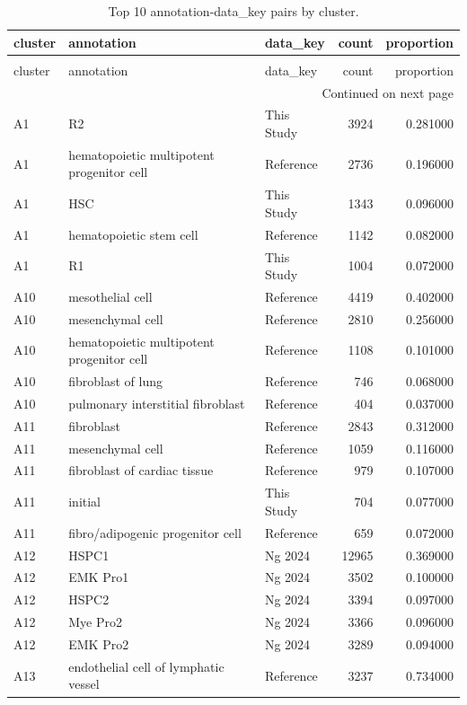 \begin{longtable}{lllrr}
\caption{Top 10 annotation-data_key pairs by cluster.} \label{tab:cluster_summary} \\
\toprule
cluster & annotation & data\_key & count & proportion \\
\midrule
\endfirsthead
\caption[]{Top 10 annotation-data_key pairs by cluster.} \\
\toprule
cluster & annotation & data\_key & count & proportion \\
\midrule
\endhead
\midrule
\multicolumn{5}{r}{Continued on next page} \\
\midrule
\endfoot
\bottomrule
\endlastfoot
A1 & R2 & This Study & 3924 & 0.281000 \\
A1 & hematopoietic multipotent progenitor cell & Reference & 2736 & 0.196000 \\
A1 & HSC & This Study & 1343 & 0.096000 \\
A1 & hematopoietic stem cell & Reference & 1142 & 0.082000 \\
A1 & R1 & This Study & 1004 & 0.072000 \\
A10 & mesothelial cell & Reference & 4419 & 0.402000 \\
A10 & mesenchymal cell & Reference & 2810 & 0.256000 \\
A10 & hematopoietic multipotent progenitor cell & Reference & 1108 & 0.101000 \\
A10 & fibroblast of lung & Reference & 746 & 0.068000 \\
A10 & pulmonary interstitial fibroblast & Reference & 404 & 0.037000 \\
A11 & fibroblast & Reference & 2843 & 0.312000 \\
A11 & mesenchymal cell & Reference & 1059 & 0.116000 \\
A11 & fibroblast of cardiac tissue & Reference & 979 & 0.107000 \\
A11 & initial & This Study & 704 & 0.077000 \\
A11 & fibro/adipogenic progenitor cell & Reference & 659 & 0.072000 \\
A12 & HSPC1 & Ng 2024 & 12965 & 0.369000 \\
A12 & EMK Pro1 & Ng 2024 & 3502 & 0.100000 \\
A12 & HSPC2 & Ng 2024 & 3394 & 0.097000 \\
A12 & Mye Pro2 & Ng 2024 & 3366 & 0.096000 \\
A12 & EMK Pro2 & Ng 2024 & 3289 & 0.094000 \\
A13 & endothelial cell of lymphatic vessel & Reference & 3237 & 0.734000 \\

\end{longtable}
